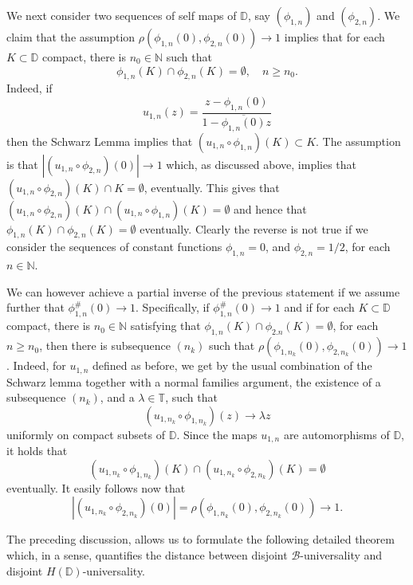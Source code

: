 \documentclass[12pt,a4paper]{amsart}
\theoremstyle{plain}
\theoremstyle{definition}
\theoremstyle{remark}
\theoremstyle{fact}
\begin{document}
    We next consider two sequences of self maps of $\mathbb{D}$, say $(\phi_{1,n})$ and $(\phi_{2,n})$. We claim that the assumption $\rho(\phi_{1,n}(0),\phi_{2,n}(0))\rightarrow 1$ implies that for each $K\subset \mathbb{D}$ compact, there is $n_0\in \mathbb{N}$ such that 
    $$
    \phi_{1,n}(K)\cap \phi_{2,n}(K)=\emptyset, \quad n\geq n_0.
    $$
    Indeed, if 
    $$
     u_{1,n}(z)=\frac{z-\phi_{1,n}(0)}{1-\overline{\phi_{1,n}(0)}z}
    $$
    then the Schwarz Lemma implies that $(u_{1,n}\circ \phi_{1,n})(K)\subset K$. The assumption is that $|(u_{1,n}\circ \phi_{2,n})(0)|\rightarrow 1$ which, as discussed above, implies that $(u_{1,n}\circ \phi_{2,n})(K)\cap K=\emptyset$, eventually. This gives that $(u_{1,n}\circ \phi_{2,n})(K)\cap (u_{1,n}\circ \phi_{1,n})(K)=\emptyset$ and hence that $\phi_{1,n}(K)\cap \phi_{2,n}(K)=\emptyset$ eventually. Clearly the reverse is not true if we consider the sequences of constant functions $\phi_{1,n}=0$, and $\phi_{2,n}=1/2$, for each $n\in \mathbb{N}$.

    We can however achieve a partial inverse of the previous statement if we assume further that $\phi_{1,n}^\#(0)\rightarrow 1$. Specifically, if $\phi_{1,n}^\#(0)\rightarrow 1$ and if for each $K\subset \mathbb{D}$ compact, there is $n_0\in \mathbb{N}$ satisfying that $\phi_{1,n}(K)\cap \phi_{2.n}(K)=\emptyset$, for each $n\geq n_0$, then there is subsequence $(n_k)$ such that $\rho(\phi_{1,n_k}(0),\phi_{2,n_k}(0))\rightarrow 1$. Indeed, for $u_{1,n}$ defined as before, we get by the usual combination of the Schwarz lemma together with a normal families argument, the existence of a subsequence $(n_k)$, and a $\lambda \in \mathbb{T}$, such that 
    $$
    (u_{1,n_k}\circ \phi_{1,n_k})(z)\rightarrow \lambda z
    $$
    uniformly on compact subsets of $\mathbb{D}$. Since the maps $u_{1,n}$ are automorphisms of $\mathbb{D}$, it holds that 
    $$
    (u_{1,n_k}\circ \phi_{1,n_k})(K)\cap (u_{1,n_k}\circ \phi_{2,n_k})(K)=\emptyset 
    $$
    eventually. It easily follows now that
    $$
    |(u_{1,n_k}\circ \phi_{2,n_k})(0)|=\rho(\phi_{1,n_k}(0),\phi_{2,n_k}(0))\rightarrow 1.
    $$

    The preceding discussion, allows us to formulate the following detailed theorem which, in a sense, quantifies the distance between disjoint $\mathcal{B}$-universality and disjoint $H(\mathbb{D})$-universality. 
\end{document}
